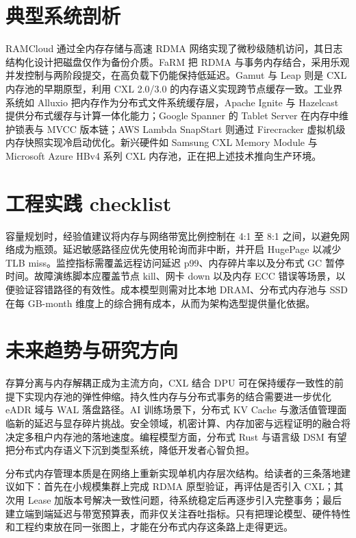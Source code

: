 \chapter{典型系统剖析}
RAMCloud 通过全内存存储与高速 RDMA 网络实现了微秒级随机访问，其日志结构化设计把磁盘仅作为备份介质。FaRM 把 RDMA 与事务内存结合，采用乐观并发控制与两阶段提交，在高负载下仍能保持低延迟。Gamut 与 Leap 则是 CXL 内存池的早期原型，利用 CXL 2.0/3.0 的内存语义实现跨节点缓存一致。工业界系统如 Alluxio 把内存作为分布式文件系统缓存层，Apache Ignite 与 Hazelcast 提供分布式缓存与计算一体化能力；Google Spanner 的 Tablet Server 在内存中维护锁表与 MVCC 版本链；AWS Lambda SnapStart 则通过 Firecracker 虚拟机级内存快照实现冷启动优化。新兴硬件如 Samsung CXL Memory Module 与 Microsoft Azure HBv4 系列 CXL 内存池，正在把上述技术推向生产环境。\par
\chapter{工程实践 checklist}
容量规划时，经验值建议将内存与网络带宽比例控制在 4:1 至 8:1 之间，以避免网络成为瓶颈。延迟敏感路径应优先使用轮询而非中断，并开启 HugePage 以减少 TLB miss。监控指标需覆盖远程访问延迟 p99、内存碎片率以及分布式 GC 暂停时间。故障演练脚本应覆盖节点 kill、网卡 down 以及内存 ECC 错误等场景，以便验证容错路径的有效性。成本模型则需对比本地 DRAM、分布式内存池与 SSD 在每 GB-month 维度上的综合拥有成本，从而为架构选型提供量化依据。\par
\chapter{未来趋势与研究方向}
存算分离与内存解耦正成为主流方向，CXL 结合 DPU 可在保持缓存一致性的前提下实现内存池的弹性伸缩。持久性内存与分布式事务的结合需要进一步优化 eADR 域与 WAL 落盘路径。AI 训练场景下，分布式 KV Cache 与激活值管理面临新的延迟与显存碎片挑战。安全领域，机密计算、内存加密与远程证明的融合将决定多租户内存池的落地速度。编程模型方面，分布式 Rust 与语言级 DSM 有望把分布式内存语义下沉到类型系统，降低开发者心智负担。\par
分布式内存管理本质是在网络上重新实现单机内存层次结构。给读者的三条落地建议如下：首先在小规模集群上完成 RDMA 原型验证，再评估是否引入 CXL；其次用 Lease 加版本号解决一致性问题，待系统稳定后再逐步引入完整事务；最后建立端到端延迟与带宽预算表，而非仅关注吞吐指标。只有把理论模型、硬件特性和工程约束放在同一张图上，才能在分布式内存这条路上走得更远。\par
